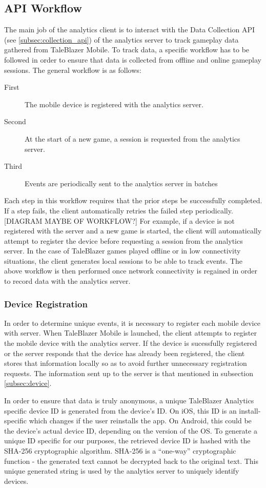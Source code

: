 \subsection{API Workflow}

The main job of the analytics client is to interact with the Data Collection API (see \ref{subsec:collection_api}) of the analytics server to track gameplay data gathered from TaleBlazer Mobile. To track data, a specific workflow has to be followed in order to ensure that data is collected from offline and online gameplay sessions. The general workflow is as follows:
	\begin{description}
		\item[First] The mobile device is registered with the analytics server.
		\item[Second] At the start of a new game, a session is requested from the analytics server.
		\item[Third] Events are periodically sent to the analytics server in batches
	\end{description}
Each step in this workflow requires that the prior steps be successfully completed. If a step fails, the client automatically retries the failed step periodically. [DIAGRAM MAYBE OF WORKFLOW?] For example, if a device is not registered with the server and a new game is started, the client will automatically attempt to register the device before requesting a session from the analytics server. In the case of TaleBlazer games played offline or in low connectivity situations, the client generates local sessions to be able to track events. The above workflow is then performed once network connectivity is regained in order to record data with the analytics server.

\subsubsection{Device Registration}

In order to determine unique events, it is necessary to register each mobile device with server. When TaleBlazer Mobile is launched, the client attempts to register the mobile device with the analytics server.
If the device is sucessfully registered or the server responds that the device has already been registered, the client stores that information locally so as to avoid further unnecessary registration requests. The information sent up to the server is that mentioned in subsection \ref{subsec:device}. 

In order to ensure that data is truly anonymous, a unique TaleBlazer Analytics specific device ID is generated from the device's ID. On iOS, this ID is an install-specific which changes if the user reinstalls the app. On Android, this could be the device's actual device ID, depending on the version of the OS. To generate a unique ID specific for our purposes, the retrieved device ID is hashed with the SHA-256 cryptographic algorithm. SHA-256 is a ``one-way'' cryptographic function - the generated text cannot be decrypted back to the original text. This unique generated string is used by the analytics server to uniquely identify devices. 


